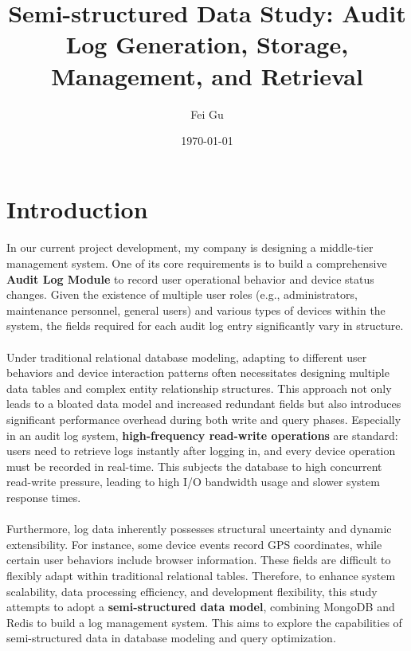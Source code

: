 \documentclass{article}
\title{Semi-structured Data Study: Audit Log Generation, Storage, Management, and Retrieval}
\author{Fei Gu}
\date{\today}
\begin{document}
\maketitle

\section{Introduction}

\paragraph{} In our current project development, my company is designing a middle-tier management system. One of its core requirements is to build a comprehensive \textbf{Audit Log Module} to record user operational behavior and device status changes. Given the existence of multiple user roles (e.g., administrators, maintenance personnel, general users) and various types of devices within the system, the fields required for each audit log entry significantly vary in structure.

\paragraph{} Under traditional relational database modeling, adapting to different user behaviors and device interaction patterns often necessitates designing multiple data tables and complex entity relationship structures. This approach not only leads to a bloated data model and increased redundant fields but also introduces significant performance overhead during both write and query phases. Especially in an audit log system, \textbf{high-frequency read-write operations} are standard: users need to retrieve logs instantly after logging in, and every device operation must be recorded in real-time. This subjects the database to high concurrent read-write pressure, leading to high I/O bandwidth usage and slower system response times.

\paragraph{} Furthermore, log data inherently possesses structural uncertainty and dynamic extensibility. For instance, some device events record GPS coordinates, while certain user behaviors include browser information. These fields are difficult to flexibly adapt within traditional relational tables. Therefore, to enhance system scalability, data processing efficiency, and development flexibility, this study attempts to adopt a \textbf{semi-structured data model}, combining MongoDB and Redis to build a log management system. This aims to explore the capabilities of semi-structured data in database modeling and query optimization.
\end{document}
